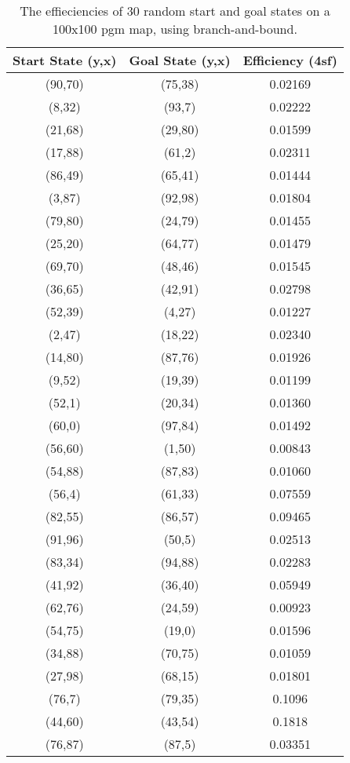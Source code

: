 \documentclass[11pt,oneside]{article}
\begin{document}
\begin{table}[ht]
    \centering
    \begin{tabular}{|c|c|c|}
	Start State (y,x)	&Goal State (y,x)	&Efficiency (4sf) \\ \hline
	(90,70)		&(75,38)		&0.02169 \\
	(8,32)			&(93,7)		&0.02222 \\
	(21,68)		&(29,80)		&0.01599 \\
	(17,88)		&(61,2)		&0.02311 \\
	(86,49)		&(65,41)		&0.01444 \\
	(3,87)			&(92,98)  		&0.01804 \\
	(79,80)		&(24,79)		&0.01455 \\
	(25,20)		&(64,77)		&0.01479 \\
	(69,70)		&(48,46)		&0.01545 \\
	(36,65)		&(42,91)		&0.02798 \\
	(52,39)		&(4,27)		&0.01227 \\
	(2,47)			&(18,22)		&0.02340 \\
	(14,80)		&(87,76)		&0.01926 \\
	(9,52)			&(19,39)		&0.01199 \\
	(52,1)			&(20,34)		&0.01360 \\
	(60,0)			&(97,84)		&0.01492 \\
	(56,60)		&(1,50)		&0.00843 \\
	(54,88)		&(87,83)		&0.01060 \\
	(56,4)			&(61,33)		&0.07559 \\
	(82,55)		&(86,57)		&0.09465 \\
	(91,96)		&(50,5)		&0.02513 \\
	(83,34)		&(94,88)		&0.02283 \\
	(41,92)		&(36,40)		&0.05949 \\
	(62,76)		&(24,59)		&0.00923 \\
	(54,75)		&(19,0)		&0.01596 \\
	(34,88)		&(70,75)		&0.01059 \\
	(27,98)		&(68,15)		&0.01801 \\
	(76,7)			&(79,35)		&0.1096 \\
	(44,60)		&(43,54)		&0.1818 \\
	(76,87)		&(87,5)		&0.03351 \\

    \end{tabular}
    \caption{The effieciencies of 30 random start and goal states on a 100x100 pgm map, using branch-and-bound.}
    \label{tab:bandbeff}
\end{table}
\end{document}
